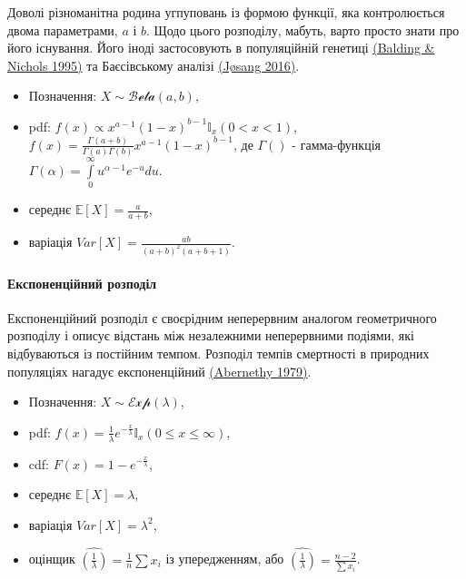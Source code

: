 \documentclass[
  11pt,
]{book}
\begin{document}
Доволі різноманітна родина угпуповань із формою функції, яка
контролюється двома параметрами, \(a\) і \(b\). Щодо цього розподілу,
мабуть, варто просто знати про його існування. Його іноді застосовують в
популяційній генетиці
\href{https://doi.org/10.1007\%2FBF01441146}{(Balding \& Nichols 1995)}
та Баєсівському аналізі
\href{https://doi.org/10.1109/MFI.2016.7849531}{(Jøsang 2016)}.

\begin{itemize}
\item
  Позначення: \(X \sim \mathcal{Beta}(a, b)\),
\item
  pdf: \(f(x) \propto x^{a - 1} (1-x)^{b-1} \mathbb{I}_x(0 < x < 1)\),
  \(f(x) = \frac{\Gamma (a + b)}{\Gamma (a) \Gamma (b)} x^{a - 1} (1 - x)^{b - 1}\),
  де \(\Gamma()\) - гамма-функція
  \(\Gamma(\alpha) = \int \limits_0^{\infty} u^{\alpha - 1} e^{-u} du\).
\item
  середнє \(\mathbb{E} [X] = \frac{a}{a + b}\),
\item
  варіація \(Var[X] = \frac{ab}{(a+b)^2 (a+b+1)}\).
\end{itemize}

\paragraph{Експоненційний
розподіл}\label{ux435ux43aux441ux43fux43eux43dux435ux43dux446ux456ux439ux43dux438ux439-ux440ux43eux437ux43fux43eux434ux456ux43b}

Експоненційний розподіл є своєрідним неперервним аналогом геометричного
розподілу і описує відстань між незалежними неперервними подіями, які
відбуваються із постійним темпом. Розподіл темпів смертності в природних
популяціях нагадує експоненційний
\href{https://doi.org/10.1016/0022-5193(79)90098-5}{(Abernethy 1979)}.

\begin{itemize}
\item
  Позначення: \(X \sim \mathcal{Exp}(\lambda)\),
\item
  pdf:
  \(f(x) = \frac{1}{\lambda} e^{-\frac{x}{\lambda}} \mathbb{I}_x (0 \leq x \leq \infty)\),
\item
  cdf: \(F(x) = 1 - e^{-\frac{x}{\lambda}}\),
\item
  середнє \(\mathbb{E} [X] = \lambda\),
\item
  варіація \(Var[X] = \lambda^2\),
\item
  оцінщик \(\hat{(\frac{1}{\lambda})} = \frac{1}{n} \sum x_i\) із
  упередженням, або
  \(\hat{(\frac{1}{\lambda})} = \frac{n-2}{\sum x_i}\).
\end{itemize}
\end{document}
